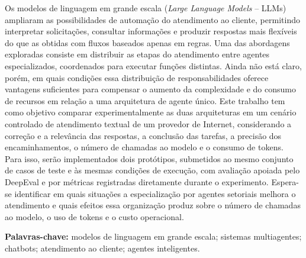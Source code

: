 \setlength{\absparsep}{18pt} 


\begin{resumo}
    
Os modelos de linguagem em grande escala (\textit{Large Language Models} -- LLMs) ampliaram as possibilidades de automação do atendimento ao cliente, permitindo interpretar solicitações, consultar informações e produzir respostas mais flexíveis do que as obtidas com fluxos baseados apenas em regras. Uma das abordagens exploradas consiste em distribuir as etapas do atendimento entre agentes especializados, coordenados para executar funções distintas. Ainda não está claro, porém, em quais condições essa distribuição de responsabilidades oferece vantagens suficientes para compensar o aumento da complexidade e do consumo de recursos em relação a uma arquitetura de agente único. Este trabalho tem como objetivo comparar experimentalmente as duas arquiteturas em um cenário controlado de atendimento textual de um provedor de Internet, considerando a correção e a relevância das respostas, a conclusão das tarefas, a precisão dos encaminhamentos, o número de chamadas ao modelo e o consumo de tokens. Para isso, serão implementados dois protótipos, submetidos ao mesmo conjunto de casos de teste e às mesmas condições de execução, com avaliação apoiada pelo DeepEval e por métricas registradas diretamente durante o experimento. Espera-se identificar em quais situações a especialização por agentes setoriais melhora o atendimento e quais efeitos essa organização produz sobre o número de chamadas ao modelo, o uso de tokens e o custo operacional.
    
\noindent\textbf{Palavras-chave:} modelos de linguagem em grande escala; sistemas multiagentes; chatbots; atendimento ao cliente; agentes inteligentes.

\end{resumo}




 

